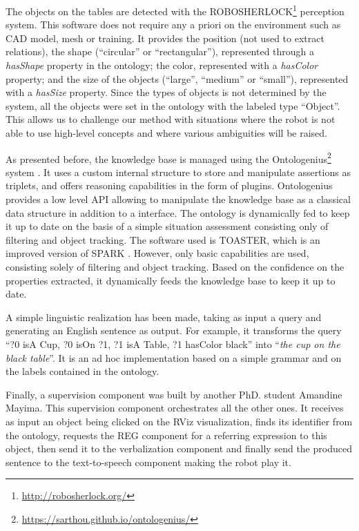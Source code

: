 \documentclass[a4paper,11pt,twoside]{StyleThese}
\begin{document}
The objects on the tables are detected with the ROBOSHERLOCK\footnote{\url{http://robosherlock.org/}} \cite{beetz2015robosherlock} perception system. This software does not require any a priori on the environment such as CAD model, mesh or training. 
It provides the position (not used to extract relations), the shape (``circular'' or ``rectangular''), represented through a \textit{hasShape} property in the ontology; the color, represented with a \textit{hasColor} property; and the size of the objects (``large'', ``medium'' or ``small''), represented with a \textit{hasSize} property. Since the types of objects is not determined by the system, all the objects were set in the ontology with the labeled type ``Object''. This allows us to challenge our method with situations where the robot is not able to use high-level concepts and where various ambiguities will be raised.

As presented before, the knowledge base is managed using the Ontologenius\footnote{\url{https://sarthou.github.io/ontologenius/}} system \cite{sarthou2019ontologenius}. 
It uses a custom internal structure to store and manipulate assertions as triplets, and offers reasoning capabilities in the form of plugins. Ontologenius provides a low level API allowing to manipulate the knowledge base as a classical data structure in addition to a \sparql{} interface.
The ontology is dynamically fed to keep it up to date on the basis of a simple situation assessment consisting only of filtering and object tracking. The software used is TOASTER, which is an improved version of SPARK \cite{milliez2014framework}. However, only basic capabilities are used, consisting solely of filtering and object tracking. Based on the confidence on the properties extracted, it dynamically feeds the knowledge base to keep it up to date.

A simple linguistic realization has been made, taking as input a \sparql{} query and generating an English sentence as output. For example, it transforms the query ``?0 isA Cup, ?0 isOn ?1, ?1 isA Table, ?1 hasColor black'' into ``\textit{the cup on the black table}''. It is an ad hoc implementation based on a simple grammar and on the labels contained in the ontology. 

Finally, a supervision component was built by another PhD. student Amandine Mayima. This supervision component orchestrates all the other ones. It receives as input an object being clicked on the RViz visualization, finds its identifier from the ontology, requests the REG component for a referring expression to this object, then send it to the verbalization component and finally send the produced sentence to the text-to-speech component making the robot play it.
\end{document}
